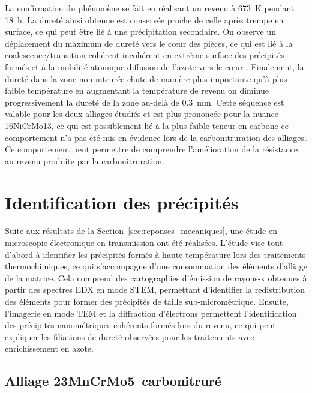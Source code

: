 La confirmation du phénomène se fait en réalisant un revenu à \SI{673}{\kelvin} pendant \SI{18}{\hour}. La dureté ainsi obtenue est conservée proche de celle après trempe en surface, ce qui peut être lié à une précipitation secondaire. On observe un déplacement du maximum de dureté vers le c{\oe}ur des pièces, ce qui est lié à la coalescence/transition cohérent-incohérent en extrême surface des précipités formés et à la mobilité atomique \textendash{} diffusion de l'azote vers le c{\oe}ur \textendash{}. Finalement, la dureté dans la zone non-nitrurée chute de manière plus importante qu'à plus faible température \textemdash{} en augmentant la température de revenu on diminue progressivement la dureté de la zone au-delà de \SI{0,3}{\milli\metre}. Cette séquence est valable pour les deux alliages étudiés et est plus prononcée pour la nuance 16NiCrMo13, ce qui est possiblement lié à la plus faible teneur en carbone \textendash{} ce comportement n'a pas été mis en évidence lors de la carbonitruration des alliages. Ce comportement peut permettre de comprendre l'amélioration de la résistance au revenu produite par la carbonitruration.

\section{Identification des précipités}
\label{sec:precipitation}

Suite aux résultats de la Section~\ref{sec:reponses_mecaniques}, une étude en  microscopie électronique en transmission ont été réalisées. L'étude vise tout d'abord à identifier les précipités formés à haute température lors des traitements thermochimiques, ce qui s'accompagne d'une consommation des éléments d'alliage de la matrice. Cela comprend des cartographies d'émission de rayons-x obtenues à partir des spectres EDX en mode STEM, permettant d'identifier la redistribution des éléments pour former des précipités de taille sub-micrométrique. Ensuite, l'imagerie en mode TEM et la diffraction d'électrons permettent l'identification des précipités nanométriques cohérents formés lors du revenu, ce qui peut expliquer les filiations de dureté observées pour les traitements avec enrichissement en azote.

\subsection{Alliage 23MnCrMo5 carbonitruré}

